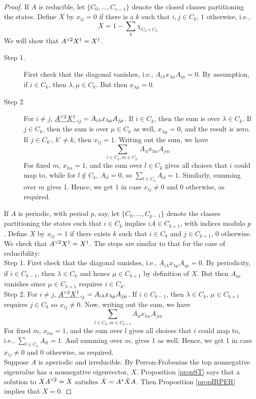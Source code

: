 \begin{proof}
If $A$ is reducible, let $\{C_0,\ldots,C_{s-1}\}$ denote the closed classes partitioning the states.
Define $X$ by $x_{ij}=0$ if there is a $k$ such that $i,j\in C_k$, $1$ otherwise, i.e.,
$$ 
  X  = 1-\sum_k \chi_{C_k\times C_k}
$$
We will show that $\spow{A}{2}\dg  X.=\dg  X.$. 
\begin{description}
\item[Step 1.] First check that the diagonal vanishes, i.e., $A_{i\lambda}x_{\lambda\mu}A_{i\mu}=0$. 
By assumption, if $i\in C_k$, then
$\lambda,\mu\in C_k$. 
But then $x_{\lambda\mu}=0$. \\

\item[Step 2.] For $i\ne j$, $\underline{\spow{A}{2}\dg  X.}_{\,ij}=A_{i\lambda}x_{\lambda\mu}A_{j\mu}$. 
If $i\in C_k$, then the sum is over
$\lambda\in C_k$. If $j\in C_k$, then the sum is over $\mu\in C_k$ as well, $x_{\lambda\mu}=0$, and the result is zero.
If $j\in C_{k'}$, $k'\ne k$, then $x_{ij}=1$. 
Writing out the sum, we have
$$ 
  \sum_{l\in C_k, m\in C_{k'}} A_{il}x_{lm}A_{jm}
$$
For fixed $m$, $x_{lm}=1$, and the sum over $l\in C_k$ gives all choices that $i$ could map to, while for $l\notin C_k$, $A_{il}=0$, so 
$\displaystyle  \sum_{l\in C_k} A_{il}=1$. 
Similarly, summing over $m$ gives 1. 
Hence, we get $1$ in case $x_{ij}\ne0$ and
$0$ otherwise, as required. 
\end{description}

If $A$ is periodic, with period $p$, say, let $\{C_0,\ldots,C_{p-1}\}$ denote the classes partitioning the states such that 
$i\in C_k$ implies $iA\in C_{k+1}$, with indices modulo $p$.
Define $X$ by $x_{ij}=1$ if there exists $k$ such that $i\in C_k$ and $j\in C_{k+1}$, $0$ otherwise.  We check that 
$\spow{A}{2}\dg  X.=\dg  X.$.  The steps are similar to that for the case of reducibility:\\

Step 1. First check that the diagonal vanishes, i.e., $A_{i\lambda}x_{\lambda\mu}A_{i\mu}=0$. By periodicity, if $i\in C_{k-1}$, then
$\lambda\in C_k$ and hence $\mu\in C_{k+1}$ by definition of $X$. But then $A_{i\mu}$ vanishes since $\mu\in C_{k+1}$ requires
$i\in C_k$.\\

Step 2. For $i\ne j$, $\underline{\spow{A}{2}\dg  X.}_{\,ij}=A_{i\lambda}x_{\lambda\mu}A_{j\mu}$. If $i\in C_{k-1}$, then
$\lambda\in C_k$, $\mu\in C_{k+1}$ requires $j\in C_k$ so $x_{ij}\ne 0$. Now, writing out the sum, we have
$$ 
  \sum_{l\in C_k, m\in C_{k+1}} A_{il}x_{lm}A_{jm}
$$
For fixed $m$, $x_{lm}=1$, and the sum over $l$ gives all choices that $i$ could map to, i.e.,
$\displaystyle  \sum_{l\in C_k} A_{il}=1$. And summing over $m$, gives 1 as well. Hence, we get $1$ in case $x_{ij}\ne0$ and
$0$ otherwise, as required.\\

Suppose $A$ is aperiodic and irreducible.  By Perron-Frobenius the top nonnegative eigenvalue has a nonnegative eigenvector, $X$.
Proposition \ref{propST} says that a solution to $X{A}^{\vee 2} =X$ satisfies $\hat X={A}^*{\hat X}{A}$. 
Then Proposition \ref{propIRPER} implies that $X=0$.
\end{proof}

